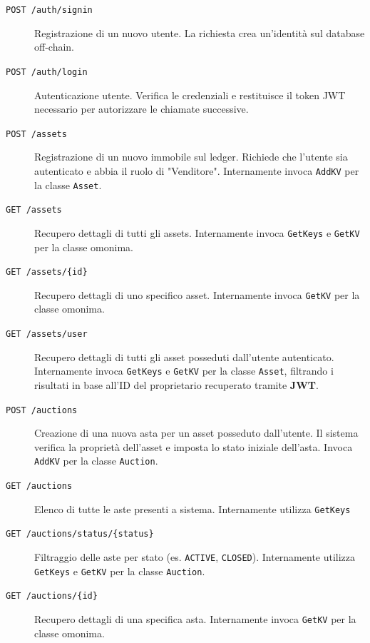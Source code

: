 \begin{description}
    \item[\texttt{POST /auth/signin}] 
    Registrazione di un nuovo utente. La richiesta crea un'identità sul database off-chain.
    
    \item[\texttt{POST /auth/login}] 
    Autenticazione utente. Verifica le credenziali e restituisce il token JWT necessario per autorizzare le chiamate successive.
    
    \item[\texttt{POST /assets}] 
    Registrazione di un nuovo immobile sul ledger. Richiede che l'utente sia autenticato e abbia il ruolo di "Venditore". Internamente invoca \texttt{AddKV} per la classe \texttt{Asset}.
    
    \item[\texttt{GET /assets}] 
    Recupero dettagli di tutti gli assets. Internamente invoca \texttt{GetKeys} e \texttt{GetKV} per la classe omonima.

    \item[\texttt{GET /assets/\{id\}}] 
    Recupero dettagli di uno specifico asset. Internamente invoca \texttt{GetKV} per la classe omonima.
    
    \item[\texttt{GET /assets/user}]
    Recupero dettagli di tutti gli asset posseduti dall'utente autenticato. Internamente invoca \texttt{GetKeys} e \texttt{GetKV} per la classe \texttt{Asset}, filtrando i risultati in base all'ID del proprietario recuperato tramite \textbf{JWT}.

    \item[\texttt{POST /auctions}] 
    Creazione di una nuova asta per un asset posseduto dall'utente. Il sistema verifica la proprietà dell'asset e imposta lo stato iniziale dell'asta. Invoca \texttt{AddKV} per la classe \texttt{Auction}.
    
    \item[\texttt{GET /auctions}] 
    Elenco di tutte le aste presenti a sistema. Internamente utilizza \texttt{GetKeys}

    \item[\texttt{GET /auctions/status/\{status\}}]
    Filtraggio delle aste per stato (es. \texttt{ACTIVE}, \texttt{CLOSED}). Internamente utilizza \texttt{GetKeys} e \texttt{GetKV} per la classe \texttt{Auction}.

    \item[\texttt{GET /auctions/\{id\}}]
    Recupero dettagli di una specifica asta. Internamente invoca \texttt{GetKV} per la classe omonima.


\end{description}
